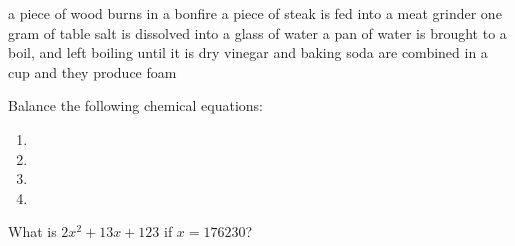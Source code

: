 \documentclass[11pt,addpoints]{exam}   	%
\begin{document}
\begin{questions}
\begin{choices}
\choice a piece of wood burns in a bonfire
\choice a piece of steak is fed into a meat grinder
\choice one gram of table salt is dissolved into a glass of water
\choice a pan of water is brought to a boil, and left boiling until it is dry
\choice vinegar and baking soda are combined in a cup and they produce foam
\end{choices}
\vspace{.2in}

\question
Balance the following chemical equations:
\begin{solution}

\begin{enumerate}
\item {} 

\item {}	

\item {}

\item {}
\end{enumerate}
\end{solution}
\vspace{.2in}

\pagebreak

\question[1] 
What is $2x^2 + 13x + 123$ if $ x = 176230 $?


\end{questions}
\end{document}
